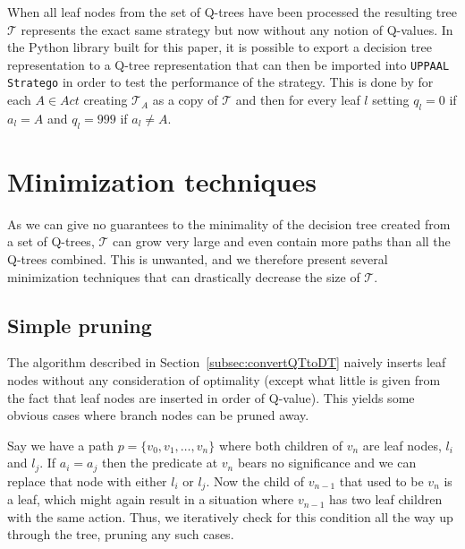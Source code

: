 When all leaf nodes from the set of Q-trees have been processed the resulting
tree $\mathcal{T}$ represents the exact same strategy but now without any notion
of Q-values. In the Python library built for this paper, it is possible to
export a decision tree representation to a Q-tree representation that can then
be imported into \texttt{UPPAAL Stratego} in order to test the performance of
the strategy. This is done by for each $A \in Act$ creating
$\mathcal{T}_A$ as a copy of $\mathcal{T}$ and then for every leaf $l$ setting
$q_l = 0$ if $a_l = A$ and $q_l = 999$ if $a_l \neq A$.

\section{Minimization techniques}%
\label{sec:minimization}

As we can give no guarantees to the minimality of the decision tree created from
a set of Q-trees, $\mathcal{T}$ can grow very large and even contain more paths
than all the Q-trees combined. This is unwanted, and we therefore present
several minimization techniques that can drastically decrease the size of
$\mathcal{T}$.

\subsection{Simple pruning}%
\label{sub:simplePrune}


The algorithm described in Section~\ref{subsec:convertQTtoDT} naively inserts
leaf nodes without any consideration of optimality (except what little is given
from the fact that leaf nodes are inserted in order of Q-value). This yields
some obvious cases where branch nodes can be pruned away.

Say we have a path $p = \{v_0, v_1, \dots, v_n \}$ where both children of $v_n$ 
are leaf nodes, $l_i$ and $l_j$. If $a_i = a_j$ then the predicate at $v_n$
bears no significance and we can replace that node with either $l_i$ or $l_j$.
Now the child of $v_{n-1}$ that used to be $v_n$ is a leaf, which might again
result in a situation where $v_{n-1}$ has two leaf children with the same
action. Thus, we iteratively check for this condition all the way up through the
tree, pruning any such cases.

